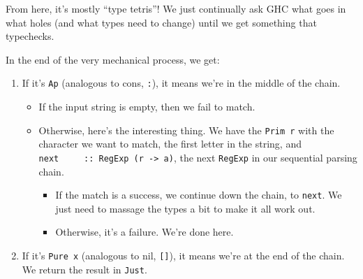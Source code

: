 \documentclass[]{article}
\newenvironment{Shaded}{}{}
\newcommand{\CommentTok}[1]{\textcolor[rgb]{0.38,0.63,0.69}{\textit{#1}}}
\newcommand{\DataTypeTok}[1]{\textcolor[rgb]{0.56,0.13,0.00}{#1}}
\newcommand{\FunctionTok}[1]{\textcolor[rgb]{0.02,0.16,0.49}{#1}}
\newcommand{\KeywordTok}[1]{\textcolor[rgb]{0.00,0.44,0.13}{\textbf{#1}}}
\newcommand{\NormalTok}[1]{#1}
\newcommand{\OperatorTok}[1]{\textcolor[rgb]{0.40,0.40,0.40}{#1}}
\newcommand{\OtherTok}[1]{\textcolor[rgb]{0.00,0.44,0.13}{#1}}
\begin{document}
From here, it's mostly ``type tetris''! We just continually ask GHC what goes in
what holes (and what types need to change) until we get something that
typechecks.

In the end of the very mechanical process, we get:

\begin{Shaded}
\end{Shaded}

\begin{enumerate}
\def\labelenumi{\arabic{enumi}.}
\item
  If it's \texttt{Ap} (analogous to cons, \texttt{:}), it means we're in the
  middle of the chain.

  \begin{itemize}
  \tightlist
  \item
    If the input string is empty, then we fail to match.
  \item
    Otherwise, here's the interesting thing. We have the \texttt{Prim\ r} with
    the character we want to match, the first letter in the string, and
    \texttt{next\ \ \ \ \ ::\ RegExp\ (r\ -\textgreater{}\ a)}, the next
    \texttt{RegExp} in our sequential parsing chain.

    \begin{itemize}
    \tightlist
    \item
      If the match is a success, we continue down the chain, to \texttt{next}.
      We just need to massage the types a bit to make it all work out.
    \item
      Otherwise, it's a failure. We're done here.
    \end{itemize}
  \end{itemize}
\item
  If it's \texttt{Pure\ x} (analogous to nil, \texttt{{[}{]}}), it means we're
  at the end of the chain. We return the result in \texttt{Just}.
\end{enumerate}
\end{document}
